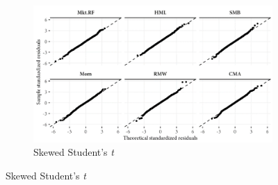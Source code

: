 \begin{figure}[tp]
\begin{subfigure}{0.70\textwidth}
  \end{subfigure}
  \begin{subfigure}{0.70\textwidth}
    \includegraphics[width=\textwidth]{graphics/qq_ghst.png}
    \caption{Skewed Student's \textit{t}}
  \end{subfigure}

  \label{fig:garch_qq}
\end{figure}
